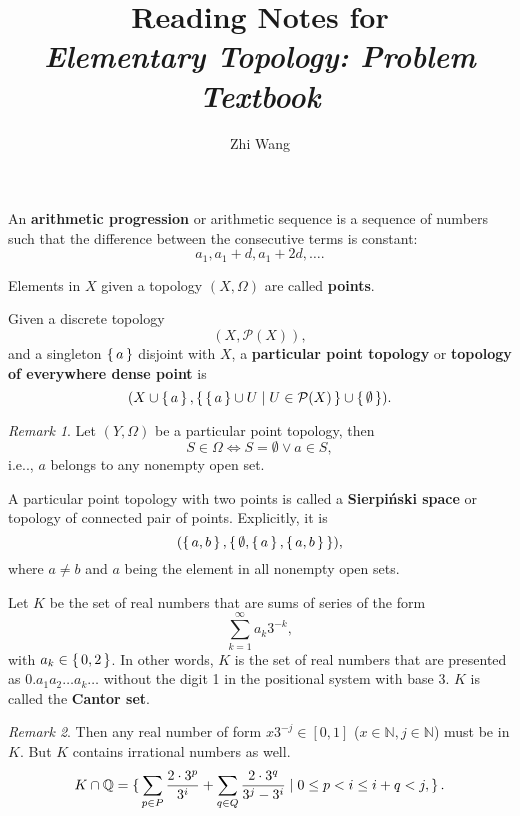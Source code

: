 \documentclass[12pt, letterpaper]{article}
\title{Reading Notes for \\ \large \textit{Elementary Topology: Problem Textbook}}
\author{Zhi Wang}
\makeatletter
\newcommand{\nat}{\mathbb{N}}
\newcommand{\rat}{\mathbb{Q}}
\newcommand\ie{i.e\@ifnextchar.{}{.\@}}
\newcommand{\power}{\mathcal{P}}
\theoremstyle{definition}
\theoremstyle{remark}
\newtheorem*{rem*}{Remark}
\theoremstyle{definition}
\theoremstyle{plain}
\makeatother
\begin{document}
	
	
	\maketitle
	
	\tableofcontents
	\begin{def*}
		An \textbf{arithmetic progression} or arithmetic sequence is a sequence of numbers such that the difference between the consecutive terms is constant:
		\[a_1,a_1+d,a_1+2d,\dots.\]
	\end{def*}
	
	\begin{def*}[point]
		Elements in $X$ given a topology $(X,\Omega)$ are called \textbf{points}.
	\end{def*}
	\begin{def*}
		Given a discrete topology 
		\[(X,\power(X)),\]
		and a singleton $\set{a}$ disjoint with $X$,
		a \textbf{particular point topology} or \textbf{topology of everywhere dense point} is
		\[(X\cup \set{a}, \set{\set{a}\cup U|U\in\power (X)}\cup \set{\emptyset}). \]
		
	\end{def*}
	\begin{rem*}
		Let $(Y, \Omega)$ be a particular point topology,
		then
		\[S \in \Omega\iff S=\emptyset \lor a \in S,\]
		\ie, $a$ belongs to any nonempty open set.
	\end{rem*}
	\begin{def*}
		A particular point topology with two points is called
		a \textbf{Sierpiński space} or topology of
		connected pair of points. Explicitly, it is
		\[(\set{a,b},\set{\emptyset,\set{a},\set{a,b}}), \]
		where $a\ne b$ and $a$ being the element in all nonempty open sets.
	\end{def*}

	\begin{def*}
		Let $K$ be the set of real numbers that are sums of series of the form
		\[\sum_{k=1}^{\infty}
		a_k 3^{-k},\]
		with $a_k \in \set{0,2}$. In other words, $K$ is the set of real numbers
		that are presented as $0.a_1a_2 \dots a_k \dots$ without the digit 1 in the positional
		system with base 3.
		$K$ is called the \textbf{Cantor set}.
	\end{def*}
	\begin{rem*}
		Then any real number of form $x3^{-j}\in[0,1]$ ($x\in\nat,j\in\nat$) must be in $K$.
		But $K$ contains irrational numbers as well.
		\[K\cap \rat=\set{\sum_{p\in P}\frac{2\cdot3^p}{3^{i}}+\sum_{q\in Q}\frac{2\cdot3^q}{3^j-3^i}|0\le p< i\le i+q< j, }. \]
	\end{rem*}
\end{document}
